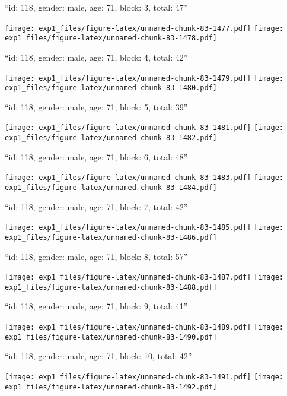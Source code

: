 \documentclass[11pt,,]{article}
\begin{document}
\newpage
[1] 

``id: 118, gender: male, age: 71, block: 3, total: 47''

\texttt{[image: exp1\_files/figure-latex/unnamed-chunk-83-1477.pdf]}
\texttt{[image: exp1\_files/figure-latex/unnamed-chunk-83-1478.pdf]}

\newpage
[1] 

``id: 118, gender: male, age: 71, block: 4, total: 42''

\texttt{[image: exp1\_files/figure-latex/unnamed-chunk-83-1479.pdf]}
\texttt{[image: exp1\_files/figure-latex/unnamed-chunk-83-1480.pdf]}

\newpage
[1] 

``id: 118, gender: male, age: 71, block: 5, total: 39''

\texttt{[image: exp1\_files/figure-latex/unnamed-chunk-83-1481.pdf]}
\texttt{[image: exp1\_files/figure-latex/unnamed-chunk-83-1482.pdf]}

\newpage
[1] 

``id: 118, gender: male, age: 71, block: 6, total: 48''

\texttt{[image: exp1\_files/figure-latex/unnamed-chunk-83-1483.pdf]}
\texttt{[image: exp1\_files/figure-latex/unnamed-chunk-83-1484.pdf]}

\newpage
[1] 

``id: 118, gender: male, age: 71, block: 7, total: 42''

\texttt{[image: exp1\_files/figure-latex/unnamed-chunk-83-1485.pdf]}
\texttt{[image: exp1\_files/figure-latex/unnamed-chunk-83-1486.pdf]}

\newpage
[1] 

``id: 118, gender: male, age: 71, block: 8, total: 57''

\texttt{[image: exp1\_files/figure-latex/unnamed-chunk-83-1487.pdf]}
\texttt{[image: exp1\_files/figure-latex/unnamed-chunk-83-1488.pdf]}

\newpage
[1] 

``id: 118, gender: male, age: 71, block: 9, total: 41''

\texttt{[image: exp1\_files/figure-latex/unnamed-chunk-83-1489.pdf]}
\texttt{[image: exp1\_files/figure-latex/unnamed-chunk-83-1490.pdf]}

\newpage
[1] 

``id: 118, gender: male, age: 71, block: 10, total: 42''

\texttt{[image: exp1\_files/figure-latex/unnamed-chunk-83-1491.pdf]}
\texttt{[image: exp1\_files/figure-latex/unnamed-chunk-83-1492.pdf]}
\end{document}
